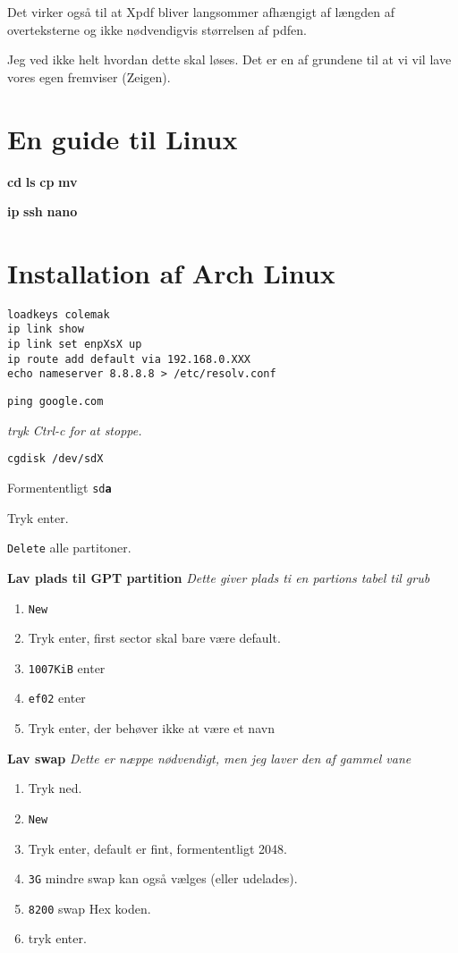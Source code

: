 \documentclass[10pt,a4paper,danish]{article}
\begin{document}
Det virker også til at Xpdf bliver langsommer afhængigt af længden af
overteksterne og ikke nødvendigvis størrelsen af pdfen.

Jeg ved ikke helt hvordan dette skal løses.
Det er en af grundene til at vi vil lave vores egen fremviser (Zeigen).

\appendix
\section{En guide til Linux}
\textbf{cd}
\textbf{ls}
\textbf{cp}
\textbf{mv}

\textbf{ip}
\textbf{ssh}
\textbf{nano}

\section{Installation af Arch Linux}
\begin{verbatim}
loadkeys colemak
ip link show
ip link set enpXsX up
ip route add default via 192.168.0.XXX
echo nameserver 8.8.8.8 > /etc/resolv.conf
\end{verbatim}

\begin{verbatim}
ping google.com
\end{verbatim}
\textit{tryk Ctrl-c for at stoppe.}

\begin{verbatim}
cgdisk /dev/sdX
\end{verbatim}

Formententligt \texttt{sd\textbf{a}}

Tryk enter.

\texttt{Delete} alle partitoner.

\textbf{Lav plads til GPT partition}
\textit{Dette giver plads ti en partions tabel til grub}\
\begin{enumerate}
\item \texttt{New}
\item Tryk enter, first sector skal bare  være default.
\item \texttt{1007KiB} enter
\item \texttt{ef02} enter
\item Tryk enter, der behøver ikke at være et navn
\end{enumerate}

\textbf{Lav swap}
\textit{Dette er næppe nødvendigt, men jeg laver den af gammel vane}
\begin{enumerate}
\item Tryk ned.
\item \texttt{New}
\item Tryk enter, default er fint, formententligt 2048.
\item \texttt{3G} mindre swap kan også vælges (eller udelades).
\item \texttt{8200} swap Hex koden.
\item tryk enter.
\end{enumerate}
\end{document}

